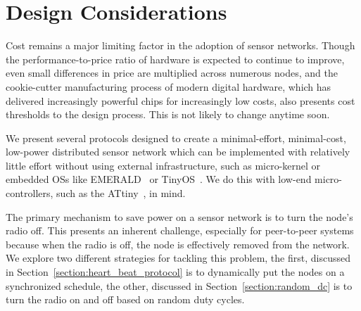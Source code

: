 \section{Design Considerations}
\label{section:design_considerations}

Cost remains a major limiting factor in the adoption of sensor networks.  Though the performance-to-price ratio of
hardware is expected to continue to improve, even small differences in price are multiplied across numerous nodes,
and the cookie-cutter manufacturing process of modern digital hardware, which has delivered increasingly powerful
chips for increasingly low costs, also presents cost thresholds to the design process.  This is not likely to change
anytime soon.

We present several protocols designed to create a minimal-effort, minimal-cost, low-power distributed sensor network
which can be implemented with relatively little effort without using external infrastructure, such as micro-kernel or
embedded OSs like EMERALD~\cite{zuberi99} or TinyOS~\cite{tinyos}.  We do this with low-end micro-controllers, such
as the ATtiny~\cite{attinyds}, in mind.

The primary mechanism to save power on a sensor network is to turn the node's radio off.  This presents an inherent
challenge, especially for peer-to-peer systems because when the radio is off, the node is effectively removed from
the network.  We explore two different strategies for tackling this problem, the first, discussed in
Section~\ref{section:heart_beat_protocol} is to dynamically put the nodes
on a synchronized schedule, the other, discussed in Section~\ref{section:random_dc} is to turn the radio on and off
based on random duty cycles.

